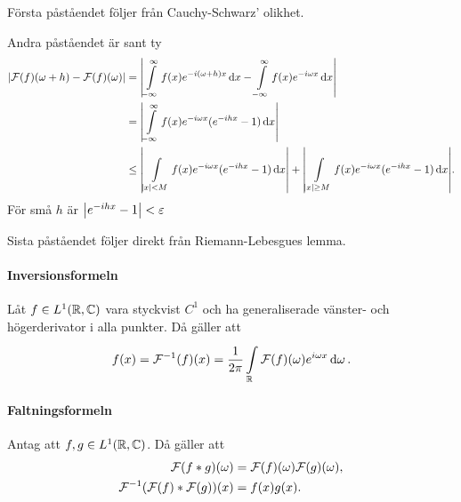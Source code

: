 \proof
Första påståendet följer från Cauchy-Schwarz' olikhet.

Andra påståendet är sant ty
\begin{align*}
	\abs{\mathcal{F}(f)(\omega + h) - \mathcal{F}(f)(\omega)} &= \abs{\int\limits_{-\infty}^{\infty}f(x)e^{-i(\omega + h)x}\dd{x} - \int\limits_{-\infty}^{\infty}f(x)e^{-i\omega x}\dd{x}} \\
	                                            &= \abs{\int\limits_{-\infty}^{\infty}f(x)e^{-i\omega x}(e^{-ihx} - 1)\dd{x}} \\
	                                            &\leq \abs{\int\limits_{\abs{x} < M}^{}f(x)e^{-i\omega x}(e^{-ihx} - 1)\dd{x}} + \abs{\int\limits_{\abs{x} \geq M}^{}f(x)e^{-i\omega x}(e^{-ihx} - 1)\dd{x}}.
\end{align*}
För små $h$ är $\abs{e^{-ihx} - 1} < \varepsilon$

Sista påståendet följer direkt från Riemann-Lebesgues lemma.

\paragraph{Inversionsformeln}
Låt $f\in L^{1}(\mathbb{R}, \mathbb{C})$ vara styckvist $C^{1}$ och ha generaliserade vänster- och högerderivator i alla punkter. Då gäller att
\begin{align*}
	f(x) = \mathcal{F}^{-1}(f)(x) = \frac{1}{2\pi}\int\limits_{\mathbb{R}}^{}\mathcal{F}(f)(\omega)e^{i\omega x}\dd{\omega}.
\end{align*}

\proof

\paragraph{Faltningsformeln}
Antag att $f, g\in L^{1}(\mathbb{R}, \mathbb{C})$. Då gäller att
\begin{align*}
	\mathcal{F}(f * g)(\omega)           &= \mathcal{F}(f)(\omega)\mathcal{F}(g)(\omega), \\
	\mathcal{F}^{-1}(\mathcal{F}(f) * \mathcal{F}(g))(x) &= f(x)g(x).
\end{align*}

